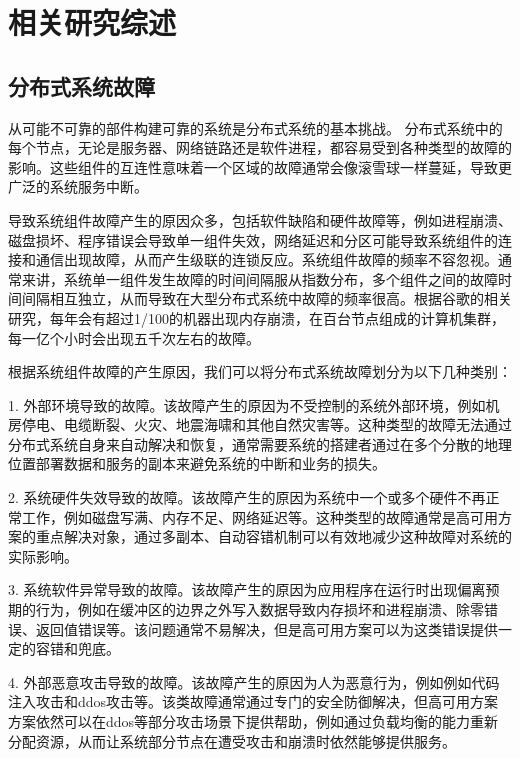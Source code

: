 
\chapter{相关研究综述}

\section{分布式系统故障}

从可能不可靠的部件构建可靠的系统是分布式系统的基本挑战。
分布式系统中的每个节点，无论是服务器、网络链路还是软件进程，都容易受到各种类型的故障的影响。这些组件的互连性意味着一个区域的故障通常会像滚雪球一样蔓延，导致更广泛的系统服务中断。

导致系统组件故障产生的原因众多，包括软件缺陷和硬件故障等，例如进程崩溃、磁盘损坏、程序错误会导致单一组件失效，网络延迟和分区可能导致系统组件的连接和通信出现故障，从而产生级联的连锁反应。系统组件故障的频率不容忽视。通常来讲，系统单一组件发生故障的时间间隔服从指数分布，多个组件之间的故障时间间隔相互独立，从而导致在大型分布式系统中故障的频率很高。根据谷歌的相关研究\cite{beyer2016site}，每年会有超过1/100的机器出现内存崩溃，在百台节点组成的计算机集群，每一亿个小时会出现五千次左右的故障。

根据系统组件故障的产生原因，我们可以将分布式系统故障划分为以下几种类别\cite{michaud20062}：

1. 外部环境导致的故障。该故障产生的原因为不受控制的系统外部环境，例如机房停电、电缆断裂、火灾、地震海啸和其他自然灾害等。这种类型的故障无法通过分布式系统自身来自动解决和恢复，通常需要系统的搭建者通过在多个分散的地理位置部署数据和服务的副本来避免系统的中断和业务的损失。

2. 系统硬件失效导致的故障。该故障产生的原因为系统中一个或多个硬件不再正常工作，例如磁盘写满、内存不足、网络延迟等。这种类型的故障通常是高可用方案的重点解决对象，通过多副本、自动容错机制可以有效地减少这种故障对系统的实际影响。

3. 系统软件异常导致的故障。该故障产生的原因为应用程序在运行时出现偏离预期的行为，例如在缓冲区的边界之外写入数据导致内存损坏和进程崩溃、除零错误、返回值错误等。该问题通常不易解决，但是高可用方案可以为这类错误提供一定的容错和兜底。

4. 外部恶意攻击导致的故障。该故障产生的原因为人为恶意行为，例如例如代码注入攻击和ddos攻击等。该类故障通常通过专门的安全防御解决，但高可用方案方案依然可以在ddos等部分攻击场景下提供帮助，例如通过负载均衡的能力重新分配资源，从而让系统部分节点在遭受攻击和崩溃时依然能够提供服务。

